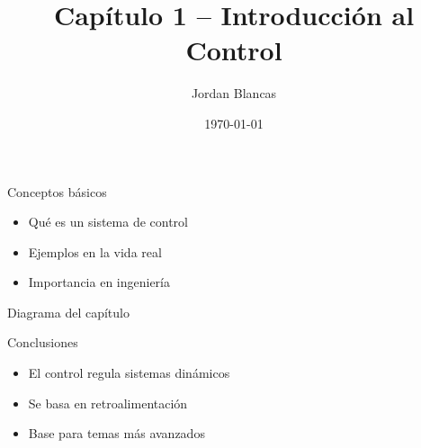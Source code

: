 \documentclass{beamer}
\title{Capítulo 1 – Introducción al Control}
\author{Jordan Blancas}
\date{\today}
\begin{document}
\begin{frame}
  \titlepage
\end{frame}

\begin{frame}{Conceptos básicos}
  \begin{itemize}
    \item Qué es un sistema de control
    \item Ejemplos en la vida real
    \item Importancia en ingeniería
  \end{itemize}
\end{frame}

\begin{frame}{Diagrama del capítulo}
  \centering
\end{frame}


\begin{frame}{Conclusiones}
  \begin{itemize}
    \item El control regula sistemas dinámicos
    \item Se basa en retroalimentación
    \item Base para temas más avanzados
  \end{itemize}
\end{frame}
\end{document}
